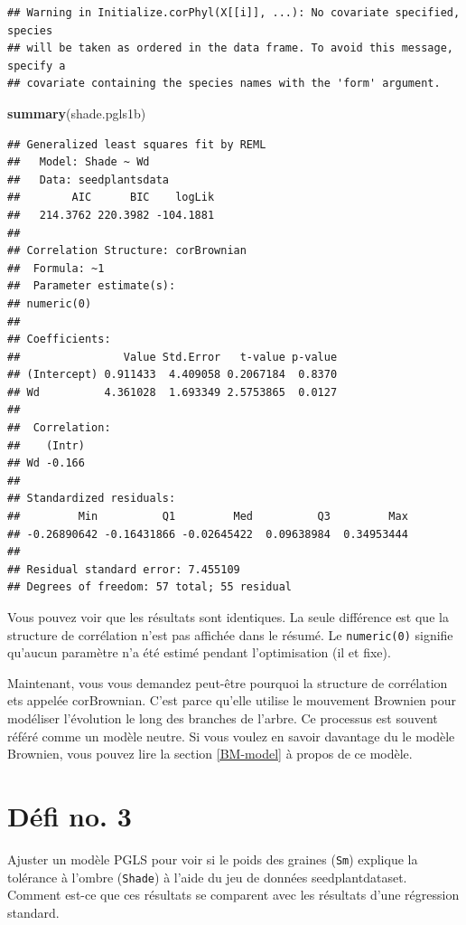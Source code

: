\documentclass[
]{book}
\newenvironment{Shaded}{\begin{snugshade}}{\end{snugshade}}
\newcommand{\FunctionTok}[1]{\textcolor[rgb]{0.13,0.29,0.53}{\textbf{#1}}}
\newcommand{\NormalTok}[1]{#1}
\begin{document}
\begin{verbatim}
## Warning in Initialize.corPhyl(X[[i]], ...): No covariate specified, species
## will be taken as ordered in the data frame. To avoid this message, specify a
## covariate containing the species names with the 'form' argument.
\end{verbatim}

\begin{Shaded}
\begin{Highlighting}[]
\FunctionTok{summary}\NormalTok{(shade.pgls1b)}
\end{Highlighting}
\end{Shaded}

\begin{verbatim}
## Generalized least squares fit by REML
##   Model: Shade ~ Wd 
##   Data: seedplantsdata 
##        AIC      BIC    logLik
##   214.3762 220.3982 -104.1881
## 
## Correlation Structure: corBrownian
##  Formula: ~1 
##  Parameter estimate(s):
## numeric(0)
## 
## Coefficients:
##                Value Std.Error   t-value p-value
## (Intercept) 0.911433  4.409058 0.2067184  0.8370
## Wd          4.361028  1.693349 2.5753865  0.0127
## 
##  Correlation: 
##    (Intr)
## Wd -0.166
## 
## Standardized residuals:
##         Min          Q1         Med          Q3         Max 
## -0.26890642 -0.16431866 -0.02645422  0.09638984  0.34953444 
## 
## Residual standard error: 7.455109 
## Degrees of freedom: 57 total; 55 residual
\end{verbatim}

Vous pouvez voir que les résultats sont identiques. La seule différence est que la structure de corrélation n'est pas affichée dans le résumé. Le \texttt{numeric(0)} signifie qu'aucun paramètre n'a été estimé pendant l'optimisation (il et fixe).

Maintenant, vous vous demandez peut-être pourquoi la structure de corrélation ets appelée corBrownian. C'est parce qu'elle utilise le mouvement Brownien pour modéliser l'évolution le long des branches de l'arbre. Ce processus est souvent référé comme un modèle neutre. Si vous voulez en savoir davantage du le modèle Brownien, vous pouvez lire la section \ref{BM-model} à propos de ce modèle.

\section{Défi no. 3}\label{duxe9fi-no.-3}

Ajuster un modèle PGLS pour voir si le poids des graines (\texttt{Sm}) explique la tolérance à l'ombre (\texttt{Shade}) à l'aide du jeu de données seedplantdataset. Comment est-ce que ces résultats se comparent avec les résultats d'une régression standard.
\end{document}
